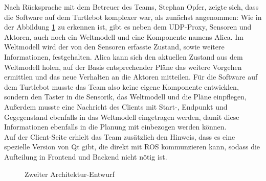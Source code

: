 \documentclass[a4paper,12pt,headsepline]{scrartcl}
\begin{document}
		Nach Rücksprache mit dem Betreuer des Teams, Stephan Opfer, zeigte sich, dass die Software auf dem Turtlebot komplexer war, als zunächst angenommen: Wie in der Abbildung \ref{fig:arch02} zu erkennen ist, gibt es neben dem UDP-Proxy, Sensoren und Aktoren, auch noch ein Weltmodell und eine Komponente namens \glqq Alica\grqq . Im Weltmodell wird der von den Sensoren erfasste Zustand, sowie weitere Informationen, festgehalten. Alica kann sich den aktuellen Zustand aus dem Weltmodell holen, auf der Basis entsprechender Pläne das weitere Vorgehen ermittlen und das neue Verhalten an die Aktoren mitteilen. Für die Software auf dem Turtlebot musste das Team also keine eigene Komponente entwicklen, sondern den Taster in die Sensorik, das Weltmodell und die Pläne einpflegen, Außerdem musste eine Nachricht des Clients mit Start-, Endpunkt und Gegegenstand ebenfalls in das Weltmodell eingetragen werden, damit diese Informationen ebenfalls in die Planung mit einbezogen werden können. \\
		Auf der Client-Seite erhielt das Team zusätzlich den Hinweis, dass es eine spezielle Version von Qt gibt, die direkt mit ROS kommunzieren kann, sodass die Aufteilung in Frontend und Backend nicht nötig ist.
		\begin{figure}[H]
			\centering
			\resizebox{\textwidth}{!}{}
			\caption{Zweiter Architektur-Entwurf}
			\label{fig:arch02}
		\end{figure}
		
\end{document}
